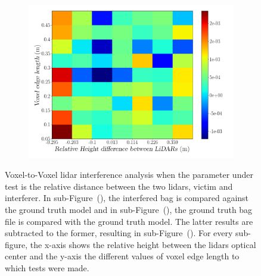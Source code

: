 \begin{figure}[!ht]
\begin{subfigure}[c]{0.45\textwidth}
	\label{fig:height:octree-ground-truth-color-mesh}
\end{subfigure}
\\ \vspace{4mm}
\begin{subfigure}[c]{0.6\textwidth}
	\includegraphics[width=\textwidth]{img/lidar-interference/height/octree_difference_color_mesh.png}
\caption{}%
	\label{fig:height:octree-difference-color-mesh}
\end{subfigure}

\caption[Voxel-to-Voxel analysis when the height between the \acsp{lidar} is variated.]{Voxel-to-Voxel \ac{lidar} interference analysis when the parameter under test is the relative distance between the two \acp{lidar}, victim and interferer. In sub-Figure~(), the interfered bag is compared against the ground truth model and in sub-Figure~(), the ground truth bag file is compared with the ground truth model. The latter results are subtracted to the former, resulting in sub-Figure~(). For every sub-figure, the x-axis shows the relative height between the \acp{lidar} optical center and the y-axis the different values of voxel edge length to which tests were made.}
\label{fig:height:octree-color-mesh}
\end{figure}

